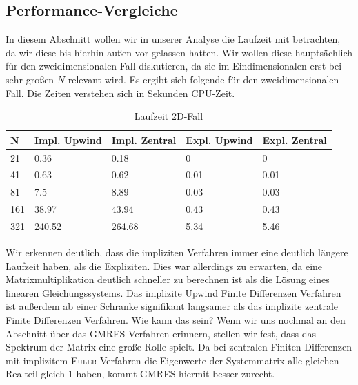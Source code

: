 \documentclass[12pt,a4paper]{scrartcl}
\numberwithin{equation}{section} %
\theoremstyle{definition}
\theoremstyle{plain}
\begin{document}
\subsection{Performance-Vergleiche}
In diesem Abschnitt wollen wir in unserer Analyse die Laufzeit mit betrachten, da wir diese bis hierhin außen vor gelassen hatten. Wir wollen diese hauptsächlich für den zweidimensionalen Fall diskutieren, da sie im Eindimensionalen erst bei sehr großen $N$ relevant wird. Es ergibt sich folgende  für den zweidimensionalen Fall. Die Zeiten verstehen sich in Sekunden CPU-Zeit.
\begin{table}[h]
\caption{Laufzeit 2D-Fall}
\begin{tabularx}{\textwidth}{|X|X|X|X|X|}
\hline
  N& Impl. Upwind& Impl. Zentral& Expl. Upwind& Expl. Zentral\\
\hline
      21      &0.36     &  0.18    &    0     &     0   \\
     41    &  0.63   &    0.62  &   0.01     &  0.01   \\
     81   &    7.5  &     8.89 &    0.03   &    0.03   \\
    161  &   38.97  &    43.94  &  0.43  &     0.43   \\
    321   & 240.52   &  264.68  &   5.34    &   5.46   \\
    \hline 
\end{tabularx}
\label{tab:Laufzeit}
\end{table} 
Wir erkennen deutlich, dass die impliziten Verfahren immer eine deutlich längere Laufzeit haben, als die Expliziten. Dies war allerdings zu erwarten, da eine Matrixmultiplikation deutlich schneller zu berechnen ist als die Lösung eines linearen Gleichungssystems. Das implizite Upwind Finite Differenzen Verfahren ist außerdem ab einer Schranke signifikant langsamer als das implizite zentrale Finite Differenzen Verfahren. Wie kann das sein? Wenn wir uns nochmal an den Abschnitt über das GMRES-Verfahren erinnern, stellen wir fest, dass das Spektrum der Matrix eine große Rolle spielt. Da bei zentralen Finiten Differenzen mit implizitem \textsc{Euler}-Verfahren die Eigenwerte der Systemmatrix alle gleichen Realteil gleich 1 haben, kommt GMRES hiermit besser zurecht.
\end{document}
